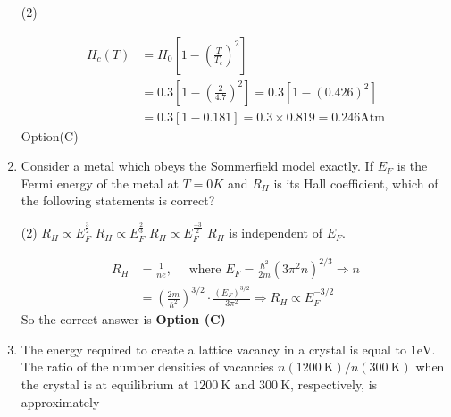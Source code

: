 \begin{enumerate}
{}
\begin{tasks}(2)
\end{tasks}
\begin{answer}
\begin{align*}
H_{c}(T)&=H_{0}\left[1-\left(\frac{T}{T_{c}}\right)^{2}\right]\\&=0.3\left[1-\left(\frac{2}{4.7}\right)^{2}\right]=0.3\left[1-(0.426)^{2}\right]\\
&=0.3[1-0.181]=0.3 \times 0.819=0.246 \mathrm{Atm}
\end{align*}
Option(C)
\end{answer}
	\item Consider a metal which obeys the Sommerfield model exactly. If $E_{F}$ is the Fermi energy of the metal at $T=0 K$ and $R_{H}$ is its Hall coefficient, which of the following statements is correct?
{}

\begin{tasks}(2)
\task[\textbf{A.}] $R_{H} \propto E_{F}^{\frac{3}{2}}$
\task[\textbf{B.}] $R_{H} \propto E_{F}^{\frac{2}{3}}$
\task[\textbf{C.}] $R_{H} \propto E_{F}^{\frac{-3}{2}}$
\task[\textbf{D.}] $R_{H}$ is independent of $E_{F}$.
\end{tasks}
\begin{answer}
\begin{align*}
R_{H}&=\frac{1}{n e}, \quad\text{ where }E_{F}=\frac{\hbar^{2}}{2 m}\left(3 \pi^{2} n\right)^{2 / 3} \Rightarrow n\\&=\left(\frac{2 m}{\hbar^{2}}\right)^{3 / 2} \cdot \frac{\left(E_{F}\right)^{3 / 2}}{3 \pi^{2}} \Rightarrow R_{H} \propto E_{F}^{-3 / 2}
\end{align*}
So the correct answer is \textbf{Option (C)}
\end{answer}
	\item The energy required to create a lattice vacancy in a crystal is equal to $1 \mathrm{eV}$. The ratio of the number densities of vacancies $n(1200 \mathrm{~K}) / n(300 \mathrm{~K})$ when the crystal is at equilibrium at $1200 \mathrm{~K}$ and $300 \mathrm{~K}$, respectively, is approximately


\end{enumerate}
